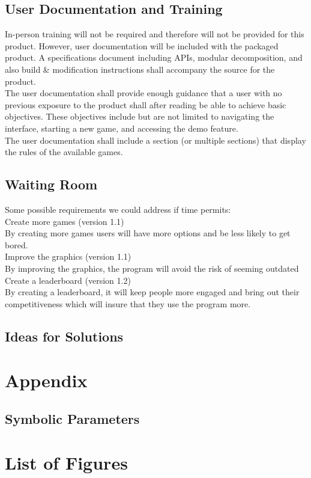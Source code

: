 \documentclass{article}
\begin{document}
		\subsection{User Documentation and Training}
		\indent In-person training will not be required and therefore will not be provided for this product. However, user documentation will be included with the packaged product. A specifications document including APIs, modular decomposition, and also build & modification instructions shall accompany the source for the product.\\
 		\indent The user documentation shall provide enough guidance that a user with no previous exposure to the product shall after reading be able to achieve basic objectives. These objectives include but are not limited to navigating the interface, starting a new game, and accessing the demo feature.\\
 		\indent The user documentation shall include a section (or multiple sections) that display the rules of the available games.

		\subsection{Waiting Room}
		\indent Some possible requirements we could address if time permits:\\
		Create more games (version 1.1) \\
		By creating more games users will have more options and be less likely to get bored. \\
		Improve the graphics (version 1.1) \\
		By improving the graphics, the program will avoid the risk of seeming outdated \\
		Create a leaderboard (version 1.2)\\
		By creating a leaderboard, it will keep people more engaged and bring out their competitiveness which will insure that they use the program more. \\

		\subsection{Ideas for Solutions}
		
	\newpage
	\section*{Appendix}
	\subsection*{Symbolic Parameters}
	
	\newpage
	\section*{List of Figures}		
		
\end{document}
